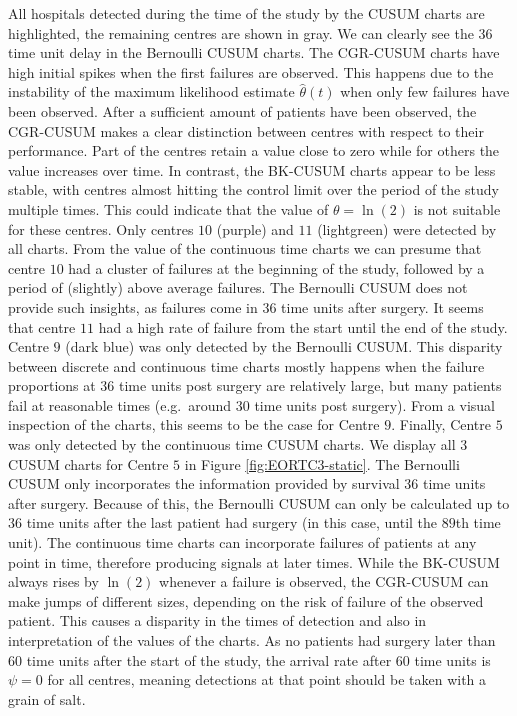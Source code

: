 All hospitals detected during the time of the study by the CUSUM charts are highlighted, the remaining centres are shown in gray. We can clearly see the \(36\) time unit delay in the Bernoulli CUSUM charts. The CGR-CUSUM charts have high initial spikes when the first failures are observed. This happens due to the instability of the maximum likelihood estimate \(\hat{\theta}(t)\) when only few failures have been observed. After a sufficient amount of patients have been observed, the CGR-CUSUM makes a clear distinction between centres with respect to their performance. Part of the centres retain a value close to zero while for others the value increases over time. In contrast, the BK-CUSUM charts appear to be less stable, with centres almost hitting the control limit over the period of the study multiple times. This could indicate that the value of \(\theta = \ln(2)\) is not suitable for these centres. Only centres \(10\) (purple) and \(11\) (lightgreen) were detected by all charts. From the value of the continuous time charts we can presume that centre \(10\) had a cluster of failures at the beginning of the study, followed by a period of (slightly) above average failures. The Bernoulli CUSUM does not provide such insights, as failures come in \(36\) time units after surgery. It seems that centre \(11\) had a high rate of failure from the start until the end of the study. Centre \(9\) (dark blue) was only detected by the Bernoulli CUSUM. This disparity between discrete and continuous time charts mostly happens when the failure proportions at \(36\) time units post surgery are relatively large, but many patients fail at reasonable times (e.g.~around \(30\) time units post surgery). From a visual inspection of the charts, this seems to be the case for Centre \(9\). Finally, Centre \(5\) was only detected by the continuous time CUSUM charts. We display all \(3\) CUSUM charts for Centre \(5\) in Figure \ref{fig:EORTC3-static}. The Bernoulli CUSUM only incorporates the information provided by survival \(36\) time units after surgery. Because of this, the Bernoulli CUSUM can only be calculated up to \(36\) time units after the last patient had surgery (in this case, until the \(89\)th time unit). The continuous time charts can incorporate failures of patients at any point in time, therefore producing signals at later times. While the BK-CUSUM always rises by \(\ln(2)\) whenever a failure is observed, the CGR-CUSUM can make jumps of different sizes, depending on the risk of failure of the observed patient. This causes a disparity in the times of detection and also in interpretation of the values of the charts. As no patients had surgery later than \(60\) time units after the start of the study, the arrival rate after \(60\) time units is \(\psi = 0\) for all centres, meaning detections at that point should be taken with a grain of salt.

